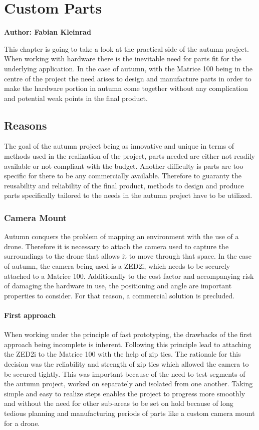 \chapter{Custom Parts}

\textbf{Author: Fabian Kleinrad} 

This chapter is going to take a look at the practical side of the autumn project. When working with hardware there is the inevitable need for parts fit for the underlying application. In the case of autumn, with the Matrice 100 being in the centre of the project the need arises to design and manufacture parts in order to make the hardware portion in autumn come together without any complication and potential weak points in the final product.

\section{Reasons}

The goal of the autumn project being as innovative and unique in terms of methods used in the realization of the project, parts needed are either not readily available or not compliant with the budget. Another difficulty is parts are too specific for there to be any commercially available. Therefore to guaranty the reusability and reliability of the final product, methods to design and produce parts specifically tailored to the needs in the autumn project have to be utilized.

\subsection{Camera Mount}

Autumn conquers the problem of mapping an environment with the use of a drone. Therefore it is necessary to attach the camera used to capture the surroundings to the drone that allows it to move through that space. In the case of autumn, the camera being used is a ZED2i, which needs to be securely attached to a Matrice 100. Additionally to the cost factor and accompanying risk of damaging the hardware in use, the positioning and angle are important properties to consider. For that reason, a commercial solution is precluded.

\subsubsection{First approach}

When working under the principle of fast prototyping, the drawbacks of the first approach being incomplete is inherent. Following this principle lead to attaching the ZED2i to the Matrice 100 with the help of zip ties. The rationale for this decision was the reliability and strength of zip ties which allowed the camera to be secured tightly. This was important because of the need to test segments of the autumn project, worked on separately and isolated from one another. Taking simple and easy to realize steps enables the project to progress more smoothly and without the need for other sub-areas to be set on hold because of long tedious planning and manufacturing periods of parts like a custom camera mount for a drone.

